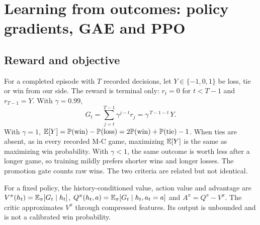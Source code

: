 \section{Learning from outcomes: policy gradients, GAE and PPO}
\label{sec:learning}

\historyscope

\subsection{Reward and objective}
For a completed episode with $T$ recorded decisions, let $Y\in\{-1,0,1\}$ be
loss, tie or win from our side. The reward is terminal only:
$r_t=0$ for $t<T-1$ and $r_{T-1}=Y$. With $\gamma=0.99$,
\begin{equation}
  G_t=\sum_{j=t}^{T-1}\gamma^{j-t}r_j=\gamma^{\,T-1-t}\,Y.
\end{equation}
With $\gamma=1$, $\mathbb{E}[Y]=\mathbb{P}(\mathrm{win})-\mathbb{P}(\mathrm{loss})
=2\mathbb{P}(\mathrm{win})+\mathbb{P}(\mathrm{tie})-1$. When ties are absent, as in every
recorded M-C game, maximizing $\mathbb{E}[Y]$ is the same as maximizing win
probability. With $\gamma<1$, the same outcome is worth less after a longer
game, so training mildly prefers shorter wins and longer losses. The promotion
gate counts raw wins. The two criteria are related but not identical.

For a fixed policy, the history-conditioned value, action value and advantage
are $V^\pi(h_t)=\mathbb{E}_\pi[G_t\mid h_t]$,
$Q^\pi(h_t,a)=\mathbb{E}_\pi[G_t\mid h_t,a_t=a]$ and $A^\pi=Q^\pi-V^\pi$. The critic
approximates $V^\pi$ through compressed features. Its output is unbounded and
is not a calibrated win probability.


